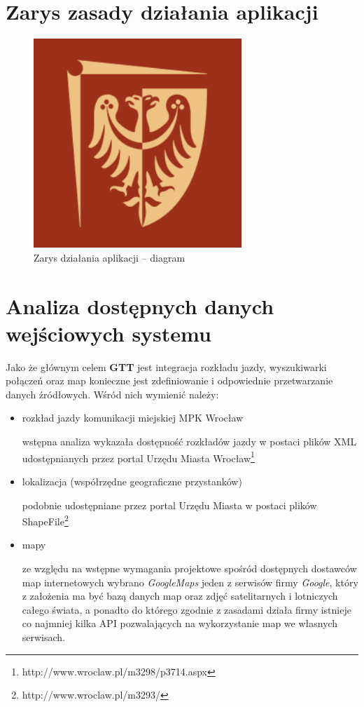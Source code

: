 \documentclass[a4paper,12pt]{article}
\begin{document}
\section{Zarys zasady działania aplikacji}
\begin{figure}[htp]
\centering
\includegraphics[width=0.7\textwidth]{pwr} 
\caption{Zarys działania aplikacji -- diagram}\label{dzialanie_systemu}
\end{figure}
\section{Analiza dostępnych danych wejściowych systemu}
Jako że głównym celem \textbf{GTT} jest integracja rozkładu jazdy, wyszukiwarki
połączeń oraz map konieczne jest zdefiniowanie i odpowiednie przetwarzanie
danych źródłowych. Wśród nich wymienić należy:
\begin{itemize}
  \item rozkład jazdy komunikacji miejskiej MPK Wrocław
  
  wstępna analiza wykazała dostępność rozkładów jazdy w postaci plików XML
  udostępnianych przez portal Urzędu Miasta Wrocław\footnote{http://www.wroclaw.pl/m3298/p3714.aspx}
  \item lokalizacja (współrzędne geograficzne przystanków)

   podobnie udostępniane przez portal Urzędu Miasta w postaci plików
   ShapeFile\footnote{http://www.wroclaw.pl/m3293/}
  \item mapy 
  
  ze względu na wstępne wymagania projektowe spośród dostępnych dostawców map
  internetowych wybrano \emph{GoogleMaps} jeden z serwisów firmy \emph{Google},
  który z założenia ma być bazą danych map oraz zdjęć satelitarnych i
  lotniczych całego świata, a ponadto do którego zgodnie z zasadami działa
  firmy istnieje co najmniej kilka API pozwalających na wykorzystanie map we
  własnych serwisach.
\end{itemize}
\end{document}
